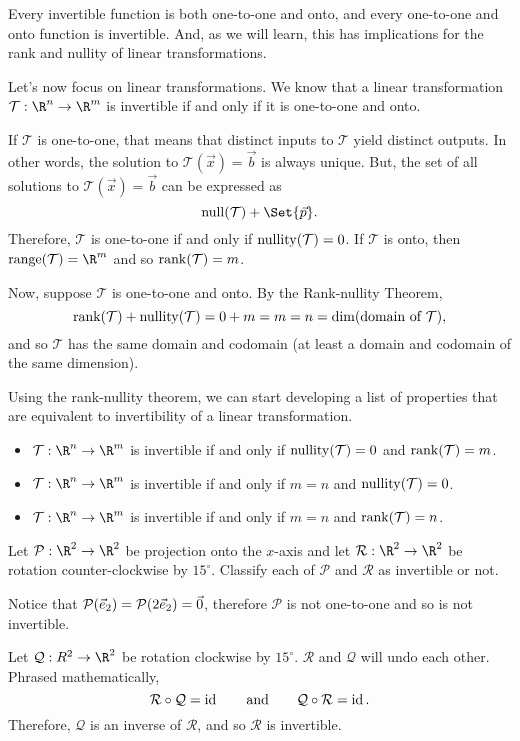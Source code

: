 
Every invertible function is both one-to-one and onto, and every one-to-one and onto function
is invertible. And, as we will learn, this has implications for the rank and nullity of linear transformations.


Let's now focus on linear transformations. We know that a linear transformation $\mathcal T:\R^n\to\R^m$ is
invertible if and only if it is one-to-one and onto. 

If $\mathcal T$ is one-to-one, that means that distinct inputs to $\mathcal T$ yield distinct outputs. In other words,
the solution to $\mathcal T(\vec x)=\vec b$ is always unique. But, the set of all solutions to $\mathcal T(\vec x)=\vec b$
can be expressed as
\[
	\Null(\mathcal T)+\Set{\vec p}.
\]
Therefore, $\mathcal T$ is one-to-one if and only if $\operatorname{nullity}(\mathcal T)=0$.
If $\mathcal T$ is onto, then $\Range(\mathcal T)=\R^m$ and so $\operatorname{rank}(\mathcal T)=m$. 

Now, suppose $\mathcal T$ is one-to-one and onto. By the Rank-nullity Theorem,
\[
	\operatorname{rank}(\mathcal T)+\operatorname{nullity}(\mathcal T) = 0+m=m=n=\operatorname{dim}(\text{domain of $\mathcal T$}),
\]
and so $\mathcal T$ has the same domain and codomain (at least a domain and codomain of the same dimension).

Using the rank-nullity theorem, we can start developing a list of properties that are equivalent to invertibility of a
linear transformation.
\begin{itemize}
	\item $\mathcal T:\R^n\to\R^m$ is invertible if and only if $\operatorname{nullity}(\mathcal T)=0$ and $\operatorname{rank}(\mathcal T)=m$.
	\item $\mathcal T:\R^n\to\R^m$ is invertible if and only if $m=n$ and $\operatorname{nullity}(\mathcal T)=0$.
	\item $\mathcal T:\R^n\to\R^m$ is invertible if and only if $m=n$ and $\operatorname{rank}(\mathcal T)=n$.
\end{itemize}

\begin{example}
	Let $\mathcal P:\R^2\to\R^2$ be projection onto the $x$-axis and let $\mathcal R:\R^2\to\R^2$ be rotation counter-clockwise
	by $15^\circ$. Classify each of $\mathcal P$ and $\mathcal R$ as invertible or not.
	
	\medskip
	Notice that $\mathcal P({\vec e_2})=\mathcal P(2{\vec e_2})=\vec 0$, therefore $\mathcal P$ is not one-to-one and so is not invertible.
	
	\medskip
	Let $\mathcal Q: R^2\to\R^2$ be rotation clockwise by $15^\circ$. $\mathcal R$ and $\mathcal Q$ will undo each other. Phrased mathematically,
	\[
	    \mathcal R\circ \mathcal Q=\operatorname{\operatorname{id}}\qquad\text{and}\qquad \mathcal Q\circ \mathcal R=\operatorname{\operatorname{id}}.
	\]
	Therefore, $\mathcal Q$ is an inverse of $\mathcal R$, and so $\mathcal R$ is invertible. 
\end{example}

